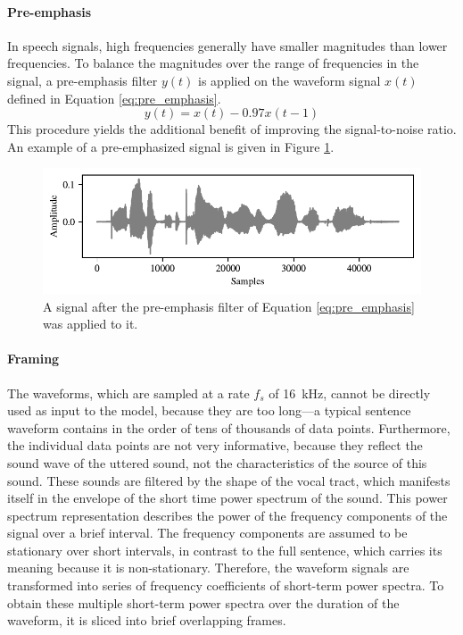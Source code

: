 		\paragraph{Pre-emphasis}

			In speech signals, high frequencies generally have smaller magnitudes than lower frequencies.
			To balance the magnitudes over the range of frequencies in the signal, a pre-emphasis filter $y(t)$ is applied on the waveform signal $x(t)$ defined in Equation \ref{eq:pre_emphasis}.
			\begin{equation}\label{eq:pre_emphasis}
				y(t) = x(t) - 0.97x(t-1)
			\end{equation}
			This procedure yields the additional benefit of improving the signal-to-noise ratio.
			An example of a pre-emphasized signal is given in Figure \ref{fig:signalemph}.
			\begin{figure}[ht]
				\centering
			    \includegraphics[width=\linewidth]{gfx/signalemph}
			    \caption[Pre-emphasis]{A signal after the pre-emphasis filter of Equation \ref{eq:pre_emphasis} was applied to it.}
			    \label{fig:signalemph}
			\end{figure}

		\paragraph{Framing}
			The waveforms, which are sampled at a rate $f_s$ of \SI{16}{\kHz}, cannot be directly used as input to the model, because they are too long---a typical sentence waveform contains in the order of tens of thousands of data points.
			Furthermore, the individual data points are not very informative, because they reflect the sound wave of the uttered sound, not the characteristics of the source of this sound.
			These sounds are filtered by the shape of the vocal tract, which manifests itself in the envelope of the short time power spectrum of the sound.
			This power spectrum representation describes the power of the frequency components of the signal over a brief interval.
			The frequency components are assumed to be stationary over short intervals, in contrast to the full sentence, which carries its meaning because it is non-stationary.
			Therefore, the waveform signals are transformed into series of frequency coefficients of short-term power spectra.
			To obtain these multiple short-term power spectra over the duration of the waveform, it is sliced into brief overlapping frames.

